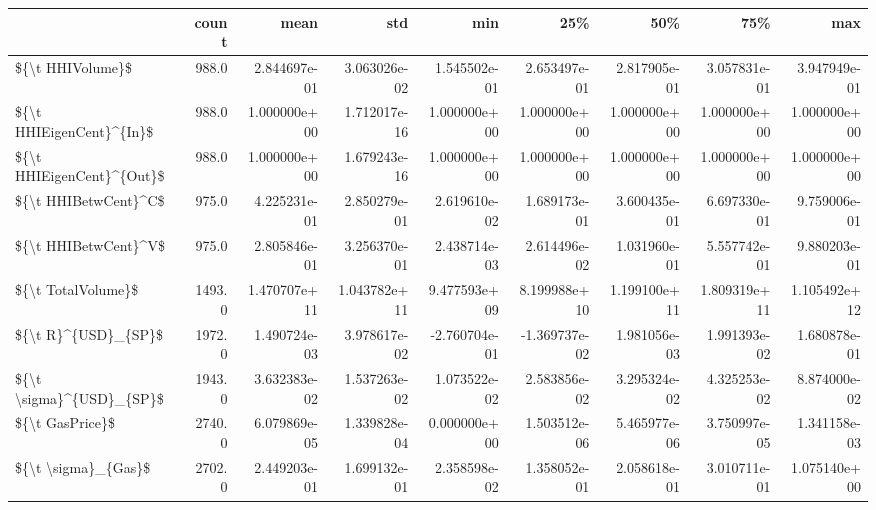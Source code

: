 \begin{tabular}{lrrrrrrrr}
\toprule
{} &   count &          mean &           std &           min &           25\% &           50\% &           75\% &           max \\
\midrule
\$\{\textbackslash t HHIVolume\}\$          &   988.0 &  2.844697e-01 &  3.063026e-02 &  1.545502e-01 &  2.653497e-01 &  2.817905e-01 &  3.057831e-01 &  3.947949e-01 \\
\$\{\textbackslash t HHIEigenCent\}\textasciicircum \{In\}\$  &   988.0 &  1.000000e+00 &  1.712017e-16 &  1.000000e+00 &  1.000000e+00 &  1.000000e+00 &  1.000000e+00 &  1.000000e+00 \\
\$\{\textbackslash t HHIEigenCent\}\textasciicircum \{Out\}\$ &   988.0 &  1.000000e+00 &  1.679243e-16 &  1.000000e+00 &  1.000000e+00 &  1.000000e+00 &  1.000000e+00 &  1.000000e+00 \\
\$\{\textbackslash t HHIBetwCent\}\textasciicircum C\$      &   975.0 &  4.225231e-01 &  2.850279e-01 &  2.619610e-02 &  1.689173e-01 &  3.600435e-01 &  6.697330e-01 &  9.759006e-01 \\
\$\{\textbackslash t HHIBetwCent\}\textasciicircum V\$      &   975.0 &  2.805846e-01 &  3.256370e-01 &  2.438714e-03 &  2.614496e-02 &  1.031960e-01 &  5.557742e-01 &  9.880203e-01 \\
\$\{\textbackslash t TotalVolume\}\$        &  1493.0 &  1.470707e+11 &  1.043782e+11 &  9.477593e+09 &  8.199988e+10 &  1.199100e+11 &  1.809319e+11 &  1.105492e+12 \\
\$\{\textbackslash t R\}\textasciicircum \{USD\}\_\{SP\}\$       &  1972.0 &  1.490724e-03 &  3.978617e-02 & -2.760704e-01 & -1.369737e-02 &  1.981056e-03 &  1.991393e-02 &  1.680878e-01 \\
\$\{\textbackslash t \textbackslash sigma\}\textasciicircum \{USD\}\_\{SP\}\$  &  1943.0 &  3.632383e-02 &  1.537263e-02 &  1.073522e-02 &  2.583856e-02 &  3.295324e-02 &  4.325253e-02 &  8.874000e-02 \\
\$\{\textbackslash t GasPrice\}\$           &  2740.0 &  6.079869e-05 &  1.339828e-04 &  0.000000e+00 &  1.503512e-06 &  5.465977e-06 &  3.750997e-05 &  1.341158e-03 \\
\$\{\textbackslash t \textbackslash sigma\}\_\{Gas\}\$       &  2702.0 &  2.449203e-01 &  1.699132e-01 &  2.358598e-02 &  1.358052e-01 &  2.058618e-01 &  3.010711e-01 &  1.075140e+00 \\
\bottomrule
\end{tabular}
